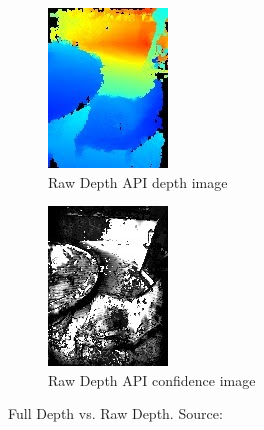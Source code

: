 \begin{figure}[ht!]
    \begin{subfigure}[b]{0.4\textwidth}
        \centering
        \includegraphics[width=0.8\linewidth]{images/depth_raw-depth-image}
        \caption{Raw Depth API depth image}
    \end{subfigure}%
    \begin{subfigure}[b]{0.4\textwidth}
        \centering
        \includegraphics[width=0.8\linewidth]{images/depth_raw-depth-confidence-image}
        \caption{Raw Depth API confidence image}
    \end{subfigure}%

    \caption{Full Depth vs. Raw Depth. Source: \cite{google_llc_arcore_doc}}
    \label{fig:depth-api-images}
\end{figure}
